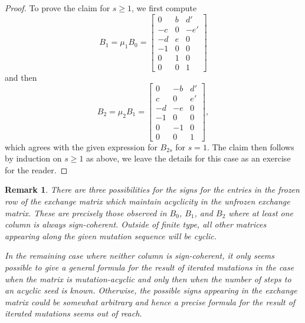 \documentclass{amsart}
\newtheorem{remark}[theorem]{Remark}
\numberwithin{theorem}{section}
\begin{document}
\begin{proof}
    To prove the claim for $s\ge 1$, we first compute
    \[B_1=\mu_1 B_0=\left[\begin{array}{ccc} 0 & b & d' \\ -c & 0 & -e'\\ -d & e & 0\\ -1 & 0 & 0\\ 0 & 1 & 0\\ 0 & 0 & 1\end{array}\right]\]
    and then
    \[B_2=\mu_2 B_1=\left[\begin{array}{ccc} 0 & -b & d' \\ c & 0 & e'\\ -d & -e & 0\\ -1 & 0 & 0\\ 0 & -1 & 0\\ 0 & 0 & 1\end{array}\right],\]
    which agrees with the given expression for $B_{2s}$ for $s=1$.
    The claim then follows by induction on $s\ge 1$ as above, we leave the details for this case as an exercise for the reader.
  \end{proof}

  \begin{remark}
    There are three possibilities for the signs for the entries in the frozen row of the exchange matrix which maintain acyclicity in the unfrozen exchange matrix.
    These are precisely those observed in $B_0$, $B_1$, and $B_2$ where at least one column is always sign-coherent.
    Outside of finite type, all other matrices appearing along the given mutation sequence will be cyclic.

    In the remaining case where neither column is sign-coherent, it only seems possible to give a general formula for the result of iterated mutations in the case when the matrix is mutation-acyclic and only then when the number of steps to an acyclic seed is known.
    Otherwise, the possible signs appearing in the exchange matrix could be somewhat arbitrary and hence a precise formula for the result of iterated mutations seems out of reach.
  \end{remark}
\end{document}
